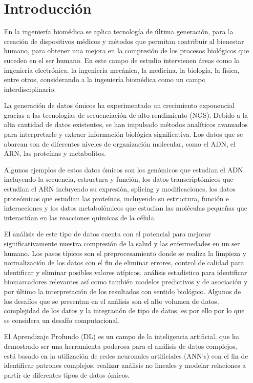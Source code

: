 \section{Introducción}

En la ingeniería biomédica se aplica tecnología de última generación, para la creación de dispositivos médicos y métodos que permitan contribuir al bienestar humano, para obtener una mejora en la compresión de los procesos biológicos que suceden en el ser humano. En este campo de estudio intervienen áreas como la ingeniería electrónica, la ingeniería mecánica, la medicina, la biología, la física, entre otros, considerando a la ingeniería biomédica como un campo interdisciplinario.

La generación de datos ómicos ha experimentado un crecimiento exponencial gracias a las tecnologías de secuenciación de alto rendimiento (NGS). Debido a la alta cantidad de datos existentes, se han impulsado métodos analíticos avanzados para interpretarle y extraer información biológica significativa. Los datos que se abarcan son de diferentes niveles de organización molecular, como el ADN, el ARN, las proteínas y metabolitos.

 Algunos ejemplos de estos datos ómicos son los genómicos que estudian el ADN incluyendo la secuencia, estructura y función, los datos transcriptómicos que estudian el ARN incluyendo su expresión, splicing y modificaciones, los datos proteómicos que estudian las proteínas, incluyendo su estructura, función e interacciones y los datos metabolómicos que estudian las moléculas pequeñas que interactúan en las reacciones químicas de la célula.

El análisis de este tipo de datos cuenta con el potencial para mejorar significativamente nuestra compresión de la salud y las enfermedades en un ser humano. Los pasos típicos son el preprocesamiento donde se realiza la limpieza y normalización de los datos con el fin de eliminar errores, control de calidad para identificar y eliminar posibles valores atípicos, análisis estadístico para identificar biomarcadores relevantes así como también modelos predictivos y de asociación y por último la interpretación de los resultados con sentido biológico.
Algunos de los desafíos que se presentan en el análisis son el alto volumen de datos, complejidad de los datos y la integración de tipo de datos, es por ello por lo que se considera un desafío computacional.

El Aprendizaje Profundo (DL) es un campo de la inteligencia artificial, que ha demostrado ser una herramienta poderosa para el análisis de datos complejos, está basado en la utilización de redes neuronales artificiales (ANN’s) con el fin de identificar patrones complejos, realizar análisis no lineales y modelar relaciones a partir de diferentes tipos de datos ómicos.

